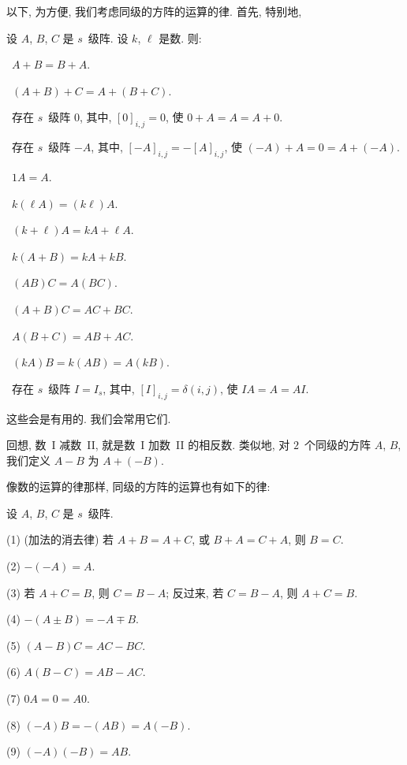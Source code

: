 \documentclass[../libro.tex]{subfiles}
\begin{document}
以下, 为方便, 我们考虑同级的方阵的运算的律.
首先, 特别地,

\begin{theorem}
    设 \(A\), \(B\), \(C\) 是 \(s\)~级阵.
    设 \(k\), \(\ell\) 是数.
    则:

    \textbullet\,
    \(A + B = B + A\).

    \textbullet\,
    \((A + B) + C = A + (B + C)\).

    \textbullet\,
    存在 \(s\)~级阵 \(0\),
    其中, \([0]_{i,j} = 0\),
    使 \(0 + A = A = A + 0\).

    \textbullet\,
    存在 \(s\)~级阵 \(-A\),
    其中, \([-A]_{i,j} = -[A]_{i,j}\),
    使 \((-A) + A = 0 = A + (-A)\).

    \textbullet\,
    \(1 A = A\).

    \textbullet\,
    \(k (\ell A) = (k \ell) A\).

    \textbullet\,
    \((k + \ell) A = k A + \ell A\).

    \textbullet\,
    \(k (A + B) = k A + k B\).

    \textbullet\,
    \((A B) C = A (B C)\).

    \textbullet\,
    \((A + B) C = A C + B C\).

    \textbullet\,
    \(A (B + C) = A B + A C\).

    \textbullet\,
    \((k A) B = k (A B) = A (k B)\).

    \textbullet\,
    存在 \(s\)~级阵 \(I = I_s\),
    其中, \([I]_{i,j} = \delta(i, j)\),
    使 \(I A = A = A I\).
\end{theorem}

这些会是有用的.
我们会常用它们.

回想, 数~I 减数~II, 就是数~I 加数~II 的相反数.
类似地, 对 \(2\)~个同级的方阵 \(A\), \(B\),
我们定义 \(A - B\) 为 \(A + (-B)\).

像数的运算的律那样, 同级的方阵的运算也有如下的律:

\begin{theorem}
    设 \(A\), \(B\), \(C\) 是 \(s\)~级阵.

    (1)
    (加法的消去律)
    若 \(A + B = A + C\), 或 \(B + A = C + A\),
    则 \(B= C\).

    (2)
    \(-(-A) = A\).

    (3)
    若 \(A + C = B\), 则 \(C = B - A\);
    反过来, 若 \(C = B - A\), 则 \(A + C = B\).

    (4)
    \(-(A \pm B) = -A \mp B\).

    (5)
    \((A - B) C = A C - B C\).

    (6)
    \(A (B - C) = A B - A C\).

    (7)
    \(0 A = 0 = A 0\).

    (8)
    \((-A) B = -(A B) = A (-B)\).

    (9)
    \((-A) (-B) = A B\).
\end{theorem}
\end{document}
